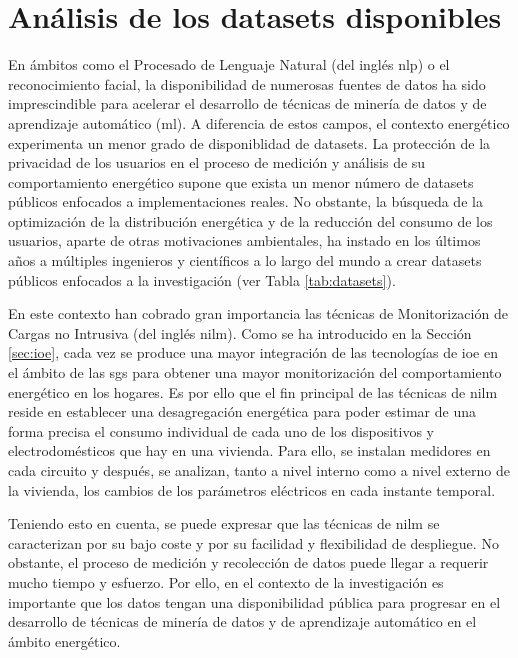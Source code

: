 \section{Análisis de los datasets disponibles}
\label{sec:sustdata}

En ámbitos como el Procesado de Lenguaje Natural (del inglés \gls{nlp}) o el reconocimiento facial, la disponibilidad de numerosas fuentes de datos ha sido imprescindible para acelerar el desarrollo de técnicas de minería de datos y de aprendizaje automático (\gls{ml}). A diferencia de estos campos, el contexto energético experimenta un menor grado de disponiblidad de datasets. La protección de la privacidad de los usuarios en el proceso de medición y análisis de su comportamiento energético supone que exista un menor número de datasets públicos enfocados a implementaciones reales. No obstante, la búsqueda de la optimización de la distribución energética y de la reducción del consumo de los usuarios, aparte de otras motivaciones ambientales, ha instado en los últimos años a múltiples ingenieros y científicos a lo largo del mundo a crear datasets públicos enfocados a la investigación (ver Tabla \ref{tab:datasets}). 

\vspace{3mm}

En este contexto han cobrado gran importancia las técnicas de Monitorización de Cargas no Intrusiva (del inglés \gls{nilm}). Como se ha introducido en la Sección \ref{sec:ioe}, cada vez se produce una mayor integración de las tecnologías de \gls{ioe} en el ámbito de las \gls{sg}s para obtener una mayor monitorización del comportamiento energético en los hogares. Es por ello que el fin principal de las técnicas de \gls{nilm} reside en establecer una desagregación energética para poder estimar de una forma precisa el consumo individual de cada uno de los dispositivos y electrodomésticos que hay en una vivienda. Para ello, se instalan medidores en cada circuito y después, se analizan, tanto a nivel interno como a nivel externo de la vivienda, los cambios de los parámetros eléctricos en cada instante temporal.~\cite{nilm} \cite{greend}

\vspace{3mm}

Teniendo esto en cuenta, se puede expresar que las técnicas de \gls{nilm} se caracterizan por su bajo coste y por su facilidad y flexibilidad de despliegue. No obstante, el proceso de medición y recolección de datos puede llegar a requerir mucho tiempo y esfuerzo. Por ello, en el contexto de la investigación es importante que los datos tengan una disponibilidad pública para progresar en el desarrollo de técnicas de minería de datos y de aprendizaje automático en el ámbito energético. 

